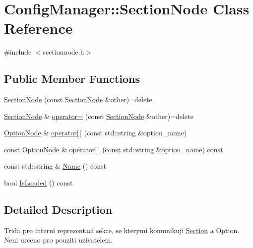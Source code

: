 \hypertarget{class_config_manager_1_1_section_node}{}\section{Config\+Manager\+:\+:Section\+Node Class Reference}
\label{class_config_manager_1_1_section_node}


{\ttfamily \#include $<$sectionnode.\+h$>$}

\subsection*{Public Member Functions}
\begin{DoxyCompactItemize}
\item 
\hyperlink{class_config_manager_1_1_section_node_a29c0bba247577ba6d163c07d54dcbe17}{Section\+Node} (const \hyperlink{class_config_manager_1_1_section_node}{Section\+Node} \&other)=delete
\item 
\hyperlink{class_config_manager_1_1_section_node}{Section\+Node} \& \hyperlink{class_config_manager_1_1_section_node_ab4b00644db1b2b7fda5f7c3a331280be}{operator=} (const \hyperlink{class_config_manager_1_1_section_node}{Section\+Node} \&other)=delete
\item 
\hyperlink{class_config_manager_1_1_option_node}{Option\+Node} \& \hyperlink{class_config_manager_1_1_section_node_a8516cbcb01048e0509f4cee76555aa43}{operator\mbox{[}$\,$\mbox{]}} (const std\+::string \&option\+\_\+name)
\item 
const \hyperlink{class_config_manager_1_1_option_node}{Option\+Node} \& \hyperlink{class_config_manager_1_1_section_node_a4ccb40813d717b21708254ace493cc26}{operator\mbox{[}$\,$\mbox{]}} (const std\+::string \&option\+\_\+name) const 
\item 
const std\+::string \& \hyperlink{class_config_manager_1_1_section_node_ad8bec497af34b75f26128136a0342699}{Name} () const 
\item 
bool \hyperlink{class_config_manager_1_1_section_node_ac557fc56f6d2cca4919949795c34abde}{Is\+Loaded} () const 
\end{DoxyCompactItemize}


\subsection{Detailed Description}
Trida pro interni reprezentaci sekce, se kterymi komunikuji \hyperlink{class_config_manager_1_1_section}{Section} a Option. Neni urceno pro pouziti uzivatelem. 

